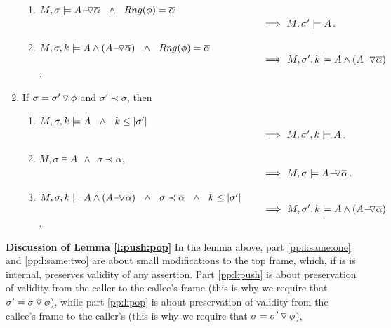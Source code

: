 \begin{lemma}
\begin{enumerate}
\begin{enumerate}
 
\item 
\label{pp:l:three}
$M, \sigma \models    {\ensuremath{ {A} \!-\!\!\!\,\!{\triangledown} \overline{\alpha} }} \ \ \wedge\ \  Rng(\phi)=\overline {\alpha}$ \\
$\strut \hspace{8cm} \Longrightarrow\  M,  {\sigma'} \models   A $.

\item
\label{pp:l:five}
$M,\sigma ,{k} \models {A \wedge ( \ensuremath{ {A} \!-\!\!\!\,\!{\triangledown} \overline{\alpha} })}  \ \ \wedge\ \  Rng(\phi)=\overline {\alpha}$ \\
$\strut \hspace{8cm} \Longrightarrow\   \satDAssertFrom M  {\sigma'} k   {A \wedge( \PushAS   {\alpha} {A})}  $.
\end{enumerate}


\item
\label{pp:l:pop}
If $\sigma=\sigma'  \, {\triangledown}\, \phi$ and $ \sigma' \prec \sigma$, then
\begin{enumerate}

\item
\label{pp:l:two}
$M,\sigma ,{k} \models {A}   \ \  \wedge\ \ k \leq |\sigma'|$ \\
$\strut \hspace{8cm} \Longrightarrow\  \satDAssertFrom M  {\sigma'} k   A  $.
 
\item
\label{pp:l:four}
$M, \sigma  \models A  \ \  %
\wedge\ \      \sigma \prec {\overline \alpha}$,\\
$\strut \hspace{8cm} \Longrightarrow \  
M, \sigma  \models {\PushAS   {\alpha} {A}}$.

\item
 \label{pp:l:six}
$M,\sigma ,{k} \models {A \wedge ( \ensuremath{ {A} \!-\!\!\!\,\!{\triangledown} \overline{\alpha} })}  \ \ \wedge\ \  \sigma \prec {\overline {\alpha}}
 \ \  \wedge\ \ k \leq |\sigma'| \ \ $ \\
$\strut \hspace{8cm} \Longrightarrow \  \satDAssertFrom M  {\sigma'} k   {A \wedge( \PushAS   {\alpha} {A})}  $.

\end{enumerate}

\end{enumerate}
\end{lemma}
 
 \noindent
\vspace{.1cm}
{\textbf{Discussion of Lemma \ref{l:push:pop}}} 
 In the lemma above, part \ref{pp:l:same:one}  and  \ref{pp:l:same:two} are
 about small modifications to the top frame, which, if is is internal, preserves validity of any assertion.
 Part \ref{pp:l:push} is about preservation of validity from the caller to the  callee's frame (this is why we require that $\sigma'=\sigma  \, {\triangledown}\, \phi$),
 while part \ref{pp:l:pop} is about preservation of validity from the callee's frame to the caller's (this is why we require that $\sigma=\sigma'  \, {\triangledown}\, \phi$),
 
